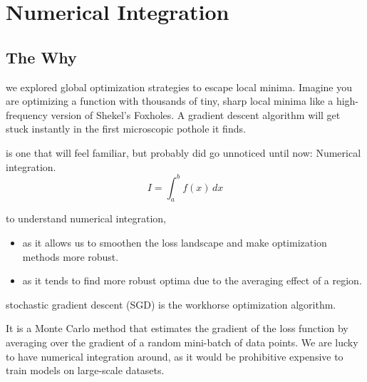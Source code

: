 \chapter{Numerical Integration}



\section{The Why}


 we explored global optimization strategies to escape local minima.
Imagine you are optimizing a function with thousands of tiny, sharp local minima like a high-frequency version of Shekel’s Foxholes. 
A gradient descent algorithm will get stuck instantly in the first microscopic pothole it finds.


 is one that will feel familiar, but probably did go unnoticed until now: Numerical integration. 
\begin{equation}
    I = \int_a^b f(x) \, dx
\end{equation}

 to understand numerical integration,
\begin{itemize}
    \item as it allows us to smoothen the loss landscape and make optimization methods more robust.
    \item as it tends to find more robust optima due to the averaging effect\cite{batchtraining} of a region.
\end{itemize}


 stochastic gradient descent (SGD) is the workhorse optimization algorithm.


It is a Monte Carlo\cite{randomsearch}\cite{montecarlodropout} method that estimates the gradient of the loss function by averaging over the gradient of a 
random mini-batch of data points. We are lucky to have numerical integration around, as it would be prohibitive expensive to train models on large-scale datasets.









